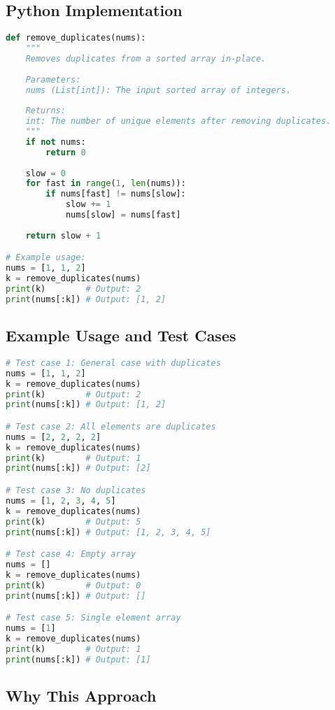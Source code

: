 \subsection*{Python Implementation}
\begin{fullwidth}
\begin{lstlisting}[language=Python]
def remove_duplicates(nums):
    """
    Removes duplicates from a sorted array in-place.
    
    Parameters:
    nums (List[int]): The input sorted array of integers.
    
    Returns:
    int: The number of unique elements after removing duplicates.
    """
    if not nums:
        return 0
    
    slow = 0
    for fast in range(1, len(nums)):
        if nums[fast] != nums[slow]:
            slow += 1
            nums[slow] = nums[fast]
    
    return slow + 1

# Example usage:
nums = [1, 1, 2]
k = remove_duplicates(nums)
print(k)        # Output: 2
print(nums[:k]) # Output: [1, 2]
\end{lstlisting}
\end{fullwidth}

\subsection*{Example Usage and Test Cases}

\begin{lstlisting}[language=Python]
# Test case 1: General case with duplicates
nums = [1, 1, 2]
k = remove_duplicates(nums)
print(k)        # Output: 2
print(nums[:k]) # Output: [1, 2]

# Test case 2: All elements are duplicates
nums = [2, 2, 2, 2]
k = remove_duplicates(nums)
print(k)        # Output: 1
print(nums[:k]) # Output: [2]

# Test case 3: No duplicates
nums = [1, 2, 3, 4, 5]
k = remove_duplicates(nums)
print(k)        # Output: 5
print(nums[:k]) # Output: [1, 2, 3, 4, 5]

# Test case 4: Empty array
nums = []
k = remove_duplicates(nums)
print(k)        # Output: 0
print(nums[:k]) # Output: []

# Test case 5: Single element array
nums = [1]
k = remove_duplicates(nums)
print(k)        # Output: 1
print(nums[:k]) # Output: [1]
\end{lstlisting}

\subsection*{Why This Approach}

